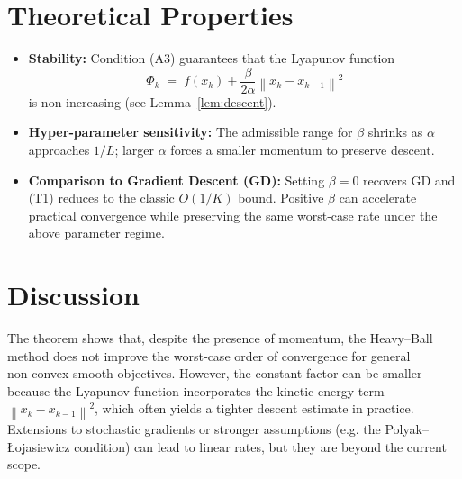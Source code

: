 \documentclass{article}
\newcommand{\norm}[1]{\left\|#1\right\|}
\begin{document}
\section*{Theoretical Properties}
\begin{itemize}
\item \textbf{Stability:} Condition (A3) guarantees that the Lyapunov function 
\[
    \Phi_{k}\;=\;f(x_{k})+\frac{\beta}{2\alpha}\norm{x_{k}-x_{k-1}}^{2}
\]
is non‑increasing (see Lemma~\ref{lem:descent}).
\item \textbf{Hyper‑parameter sensitivity:} The admissible range for $\beta$ shrinks as $\alpha$ approaches $1/L$; larger $\alpha$ forces a smaller momentum to preserve descent.
\item \textbf{Comparison to Gradient Descent (GD):} Setting $\beta=0$ recovers GD and (T1) reduces to the classic $O(1/K)$ bound. Positive $\beta$ can accelerate practical convergence while preserving the same worst‑case rate under the above parameter regime.
\end{itemize}

\section*{Discussion}
The theorem shows that, despite the presence of momentum, the Heavy–Ball method does not improve the worst‑case order of convergence for general non‑convex smooth objectives. However, the constant factor can be smaller because the Lyapunov function incorporates the kinetic energy term $\norm{x_{k}-x_{k-1}}^{2}$, which often yields a tighter descent estimate in practice. Extensions to stochastic gradients or stronger assumptions (e.g. the Polyak–Łojasiewicz condition) can lead to linear rates, but they are beyond the current scope.

\newpage
\end{document}
